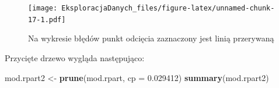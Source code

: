 \documentclass[]{book}
\newenvironment{Shaded}{\begin{snugshade}}{\end{snugshade}}
\newcommand{\DataTypeTok}[1]{\textcolor[rgb]{0.13,0.29,0.53}{#1}}
\newcommand{\FloatTok}[1]{\textcolor[rgb]{0.00,0.00,0.81}{#1}}
\newcommand{\KeywordTok}[1]{\textcolor[rgb]{0.13,0.29,0.53}{\textbf{#1}}}
\newcommand{\NormalTok}[1]{#1}
\newcommand{\StringTok}[1]{\textcolor[rgb]{0.31,0.60,0.02}{#1}}
\theoremstyle{plain}
\theoremstyle{definition}
\theoremstyle{definition}
\theoremstyle{definition}
\theoremstyle{definition}
\theoremstyle{remark}
\begin{document}
\begin{figure}
\centering
\texttt{[image: EksploracjaDanych\_files/figure-latex/unnamed-chunk-17-1.pdf]}
\caption{\label{fig:unnamed-chunk-17}Na wykresie błędów punkt odcięcia zaznaczony jest linią przerywaną}
\end{figure}

Przycięte drzewo wygląda następująco:

\begin{Shaded}
\begin{Highlighting}[]
\NormalTok{mod.rpart2 <-}\StringTok{ }\KeywordTok{prune}\NormalTok{(mod.rpart, }\DataTypeTok{cp =} \FloatTok{0.029412}\NormalTok{)}
\KeywordTok{summary}\NormalTok{(mod.rpart2)}
\end{Highlighting}
\end{Shaded}
\end{document}

